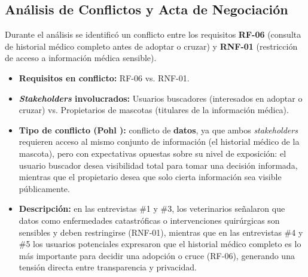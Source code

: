 \subsection{Análisis de Conflictos y Acta de Negociación}

Durante el análisis se identificó un conflicto entre los requisitos \textbf{RF-06} (consulta de historial médico completo antes de adoptar o cruzar) y \textbf{RNF-01} (restricción de acceso a información médica sensible).

\begin{itemize}[leftmargin=*]
	\item \textbf{Requisitos en conflicto:} RF-06 vs. RNF-01.
	\item \textbf{\textit{Stakeholders} involucrados:} Usuarios buscadores (interesados en adoptar o cruzar) vs. Propietarios de mascotas (titulares de la información médica).
	\item \textbf{Tipo de conflicto (Pohl \cite{pohl2025}):} conflicto de \textbf{datos}, ya que ambos \textit{stakeholders} requieren acceso al mismo conjunto de información (el historial médico de la mascota), pero con expectativas opuestas sobre su nivel de exposición: el usuario buscador desea visibilidad total para tomar una decisión informada, mientras que el propietario desea que solo cierta información sea visible públicamente.
	\item \textbf{Descripción:} en las entrevistas \#1 y \#3, los veterinarios señalaron que datos como enfermedades catastróficas o intervenciones quirúrgicas son sensibles y deben restringirse (RNF-01), mientras que en las entrevistas \#4 y \#5 los usuarios potenciales expresaron que el historial médico completo es lo más importante para decidir una adopción o cruce (RF-06), generando una tensión directa entre transparencia y privacidad.
\end{itemize}

